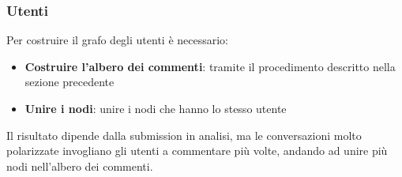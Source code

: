 \subsubsection {Utenti}

Per costruire il grafo degli utenti è necessario:

\begin{itemize}
    \item \textbf{Costruire l'albero dei commenti}: tramite il procedimento descritto nella sezione precedente
    \item \textbf{Unire i nodi}: unire i nodi che hanno lo stesso utente
\end{itemize}

Il risultato dipende dalla submission in analisi, ma le conversazioni molto polarizzate invogliano gli utenti a commentare più volte, andando ad unire più nodi nell'albero dei commenti.




